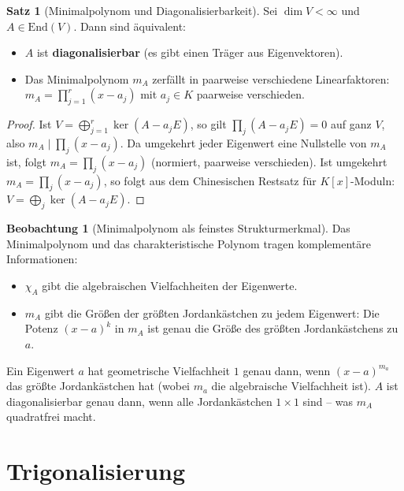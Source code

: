 ﻿\documentclass[a4paper,12pt]{report}
\theoremstyle{definition}
\newtheorem{satz}{Satz}
\newtheorem{beobachtung}{Beobachtung}
\begin{document}
\begin{satz}[Minimalpolynom und Diagonalisierbarkeit]
    Sei $\dim V < \infty$ und $A \in \mathrm{End}(V)$. Dann sind äquivalent:
    \begin{itemize}
        \item[-] $A$ ist \textbf{diagonalisierbar} (es gibt einen Träger aus Eigenvektoren).
        \item[-] Das Minimalpolynom $m_A$ zerfällt in paarweise verschiedene
              Linearfaktoren: $m_A = \prod_{j=1}^r (x - a_j)$ mit $a_j \in K$ paarweise verschieden.
    \end{itemize}
\end{satz}
\begin{proof}
    Ist $V = \bigoplus_{j=1}^r \ker(A - a_j E)$, so gilt $\prod_j (A - a_j E) = 0$
    auf ganz $V$, also $m_A \mid \prod_j (x - a_j)$. Da umgekehrt jeder Eigenwert
    eine Nullstelle von $m_A$ ist, folgt $m_A = \prod_j (x - a_j)$ (normiert,
    paarweise verschieden). Ist umgekehrt $m_A = \prod_j (x - a_j)$, so folgt
    aus dem Chinesischen Restsatz für $K[x]$-Moduln:
    $V = \bigoplus_j \ker(A - a_j E)$.
\end{proof}

\begin{beobachtung}[Minimalpolynom als feinstes Strukturmerkmal]
    Das Minimalpolynom und das charakteristische Polynom tragen
    komplementäre Informationen:
    \begin{itemize}
        \item[-] $\chi_A$ gibt die algebraischen Vielfachheiten der Eigenwerte.
        \item[-] $m_A$ gibt die Größen der größten Jordankästchen zu jedem Eigenwert:
              Die Potenz $(x - a)^k$ in $m_A$ ist genau die Größe des größten
              Jordankästchens zu $a$.
    \end{itemize}
    Ein Eigenwert $a$ hat geometrische Vielfachheit $1$ genau dann, wenn
    $(x-a)^{m_a}$ das größte Jordankästchen hat (wobei $m_a$ die algebraische
    Vielfachheit ist). $A$ ist diagonalisierbar genau dann, wenn alle
    Jordankästchen $1 \times 1$ sind -- was $m_A$ quadratfrei macht.
\end{beobachtung}

\section{Trigonalisierung}
\end{document}
